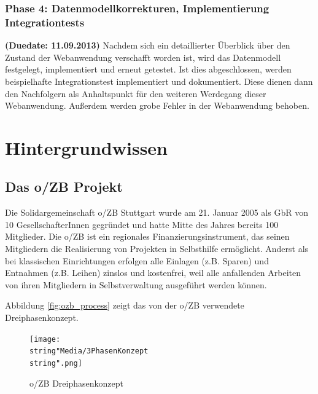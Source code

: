 \documentclass[12pt,             %
               a4paper,          %
               listof=totoc,     %
               index=totoc,      %
               bibliography=totoc,%
               oneside,         %
               BCOR1cm,          %
               english   %
               ]{scrbook}
\begin{document}
\subsection{Phase 4: Datenmodellkorrekturen, Implementierung Integrationtests}
\textbf {(Duedate: 11.09.2013)}
Nachdem sich ein detaillierter Überblick über den Zustand der Webanwendung verschafft worden ist, wird das Datenmodell festgelegt, implementiert und erneut getestet. Ist dies abgeschlossen, werden beispielhafte Integrationstest implementiert und dokumentiert. Diese dienen dann den Nachfolgern als Anhaltspunkt für den weiteren Werdegang dieser Webanwendung. Außerdem werden grobe Fehler in der Webanwendung behoben.


\clearpage
\chapter{Hintergrundwissen}
\section{Das o/ZB Projekt}
Die Solidargemeinschaft o/ZB Stuttgart wurde am 21. Januar 2005 als GbR von 10 GesellschafterInnen gegründet und hatte Mitte des Jahres bereits 100 Mitglieder.
Die o/ZB ist ein regionales Finanzierungsinstrument, das seinen Mitgliedern die Realisierung von Projekten in Selbsthilfe ermöglicht. Anderst als bei klassischen Einrichtungen erfolgen alle Einlagen (z.B. Sparen) und Entnahmen (z.B. Leihen) zinslos und kostenfrei, weil alle anfallenden Arbeiten von ihren Mitgliedern in Selbstverwaltung ausgeführt werden können.

Abbildung \vref{fig:ozb_process} zeigt das von der o/ZB verwendete Dreiphasenkonzept.
\begin{figure}[H]
     \begin{center}
          \texttt{[image: \\string"Media/3PhasenKonzept\\string".png]}
     \end{center}
     \label{fig:ozb_process}
     \caption{o/ZB Dreiphasenkonzept}
\end{figure} 
\end{document}
